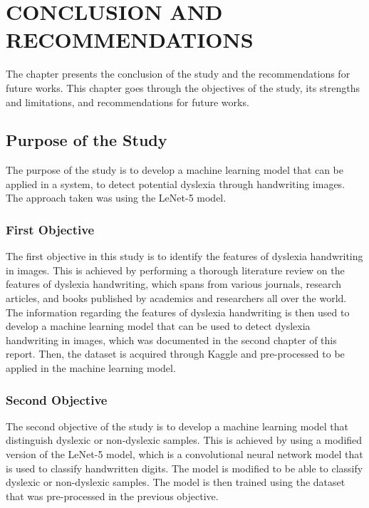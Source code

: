 \chapter{CONCLUSION AND RECOMMENDATIONS}
\label{ch:conclusion}

The chapter presents the conclusion of the study and the recommendations for future works. This chapter goes through the objectives of the study, its strengths and limitations, and recommendations for future works.

\section{Purpose of the Study}

The purpose of the study is to develop a machine learning model that can be applied in a system, to detect potential dyslexia through handwriting images. The approach taken was using the LeNet-5 model. 

\subsection{First Objective}

The first objective in this study is to identify the features of dyslexia handwriting in images. This is achieved by performing a thorough literature review on the features of dyslexia handwriting, which spans from various journals, research articles, and books published by academics and researchers all over the world. The information regarding the features of dyslexia handwriting is then used to develop a machine learning model that can be used to detect dyslexia handwriting in images, which was documented in the second chapter of this report. Then, the dataset is acquired through Kaggle and pre-processed to be applied in the machine learning model. 

\subsection{Second Objective}

The second objective of the study is to develop a machine learning model that distinguish dyslexic or non-dyslexic samples. This is achieved by using a modified version of the LeNet-5 model, which is a convolutional neural network model that is used to classify handwritten digits. The model is modified to be able to classify dyslexic or non-dyslexic samples. The model is then trained using the dataset that was pre-processed in the previous objective. 


